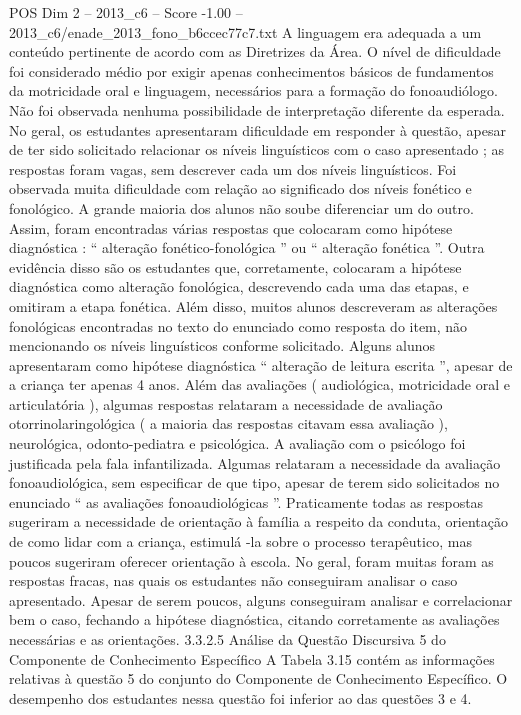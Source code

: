 \begin{textsample}{POS Dim 2 – 2013\_c6 – Score -1.00 – 2013\_c6/enade\_2013\_fono\_b6ccec77c7.txt}
A linguagem era adequada a um conteúdo pertinente de acordo com as Diretrizes da Área.
O nível de dificuldade foi considerado médio por exigir apenas conhecimentos básicos de fundamentos da motricidade oral e linguagem, necessários para a formação do fonoaudiólogo.
Não foi observada nenhuma possibilidade de interpretação diferente da esperada.
No geral, os estudantes apresentaram dificuldade em responder à questão, apesar de ter sido solicitado relacionar os níveis linguísticos com o caso apresentado ; as respostas foram vagas, sem descrever cada um dos níveis linguísticos.
Foi observada muita dificuldade com relação ao significado dos níveis fonético e fonológico.
A grande maioria dos alunos não soube diferenciar um do outro.
Assim, foram encontradas várias respostas que colocaram como hipótese diagnóstica : “ alteração fonético-fonológica ” ou “ alteração fonética ”.
Outra evidência disso são os estudantes que, corretamente, colocaram a hipótese diagnóstica como alteração fonológica, descrevendo cada uma das etapas, e omitiram a etapa fonética.
Além disso, muitos alunos descreveram as alterações fonológicas encontradas no texto do enunciado como resposta do item, não mencionando os níveis linguísticos conforme solicitado.
Alguns alunos apresentaram como hipótese diagnóstica “ alteração de leitura escrita ”, apesar de a criança ter apenas 4 anos.
Além das avaliações ( audiológica, motricidade oral e articulatória ), algumas respostas relataram a necessidade de avaliação otorrinolaringológica ( a maioria das respostas citavam essa avaliação ), neurológica, odonto-pediatra e psicológica.
A avaliação com o psicólogo foi justificada pela fala infantilizada.
Algumas relataram a necessidade da avaliação fonoaudiológica, sem especificar de que tipo, apesar de terem sido solicitados no enunciado “ as avaliações fonoaudiológicas ”.
Praticamente todas as respostas sugeriram a necessidade de orientação à família a respeito da conduta, orientação de como lidar com a criança, estimulá -la sobre o processo terapêutico, mas poucos sugeriram oferecer orientação à escola.
No geral, foram muitas foram as respostas fracas, nas quais os estudantes não conseguiram analisar o caso apresentado.
Apesar de serem poucos, alguns conseguiram analisar e correlacionar bem o caso, fechando a hipótese diagnóstica, citando corretamente as avaliações necessárias e as orientações. 3.3.2.5 Análise da Questão Discursiva 5 do Componente de Conhecimento Específico A Tabela 3.15 contém as informações relativas à questão 5 do conjunto do Componente de Conhecimento Específico.
O desempenho dos estudantes nessa questão foi inferior ao das questões 3 e 4.

\end{textsample}
